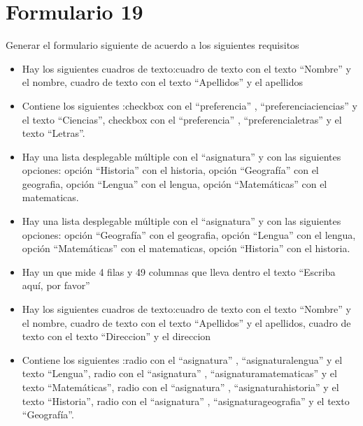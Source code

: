 \documentclass[letterpaper,10pt,spanish]{sphinxmanual}
\begin{document}
\section{Formulario 19}
\label{ejercicios/formularios/anexo_formularios:formulario-19}
Generar el formulario siguiente de acuerdo a los siguientes requisitos
\begin{itemize}
\item {} 
Hay los siguientes cuadros de texto:cuadro de texto con el texto ``Nombre'' y el  nombre, cuadro de texto con el texto ``Apellidos'' y el  apellidos

\item {} 
Contiene los siguientes :checkbox con el   ``preferencia'' ,   ``preferenciaciencias''  y el texto ``Ciencias'', checkbox con el   ``preferencia'' ,   ``preferencialetras''  y el texto ``Letras''.

\item {} 
Hay una lista desplegable múltiple con el  ``asignatura'' y con las siguientes opciones: opción ``Historia'' con el  historia, opción ``Geografía'' con el  geografia, opción ``Lengua'' con el  lengua, opción ``Matemáticas'' con el  matematicas.

\item {} 
Hay una lista desplegable múltiple con el  ``asignatura'' y con las siguientes opciones: opción ``Geografía'' con el  geografia, opción ``Lengua'' con el  lengua, opción ``Matemáticas'' con el  matematicas, opción ``Historia'' con el  historia.

\item {} 
Hay un  que mide 4 filas y 49 columnas que lleva dentro el texto ``Escriba aquí, por favor''

\item {} 
Hay los siguientes cuadros de texto:cuadro de texto con el texto ``Nombre'' y el  nombre, cuadro de texto con el texto ``Apellidos'' y el  apellidos, cuadro de texto con el texto ``Direccion'' y el  direccion

\item {} 
Contiene los siguientes :radio con el   ``asignatura'' ,   ``asignaturalengua''  y el texto ``Lengua'', radio con el   ``asignatura'' ,   ``asignaturamatematicas''  y el texto ``Matemáticas'', radio con el   ``asignatura'' ,   ``asignaturahistoria''  y el texto ``Historia'', radio con el   ``asignatura'' ,   ``asignaturageografia''  y el texto ``Geografía''.

\end{itemize}
\end{document}
